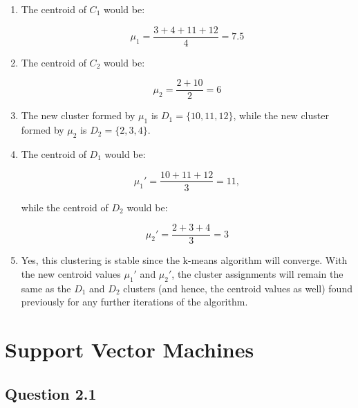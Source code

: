 \documentclass[11pt,fancychapters]{article}
\begin{document}
\begin{enumerate}[label=\textbf{\alph*)}]
	
\item The centroid of $C_1$ would be:

\begin{equation*}
	\mu_1 = \frac{3 + 4 + 11 + 12}{4} = 7.5
\end{equation*}

\item The centroid of $C_2$ would be:

\begin{equation*}
	\mu_2 = \frac{2 + 10}{2} = 6
\end{equation*}

\item The new cluster formed by $\mu_1$ is $D_1 = \{10, 11, 12\}$, while the new cluster formed by $\mu_2$ is $D_2 = \{2, 3, 4\}$.

\item The centroid of $D_1$ would be:

\begin{equation*}
	\mu_1' = \frac{10 + 11 + 12}{3} = 11,
\end{equation*}

while the centroid of $D_2$ would be:

\begin{equation*}
	\mu_2' = \frac{2 + 3 + 4}{3} = 3
\end{equation*}

\item Yes, this clustering is stable since the k-means algorithm will converge. With the new centroid values $\mu_1'$ and $\mu_2'$, the cluster assignments will remain the same as the $D_1$ and $D_2$ clusters (and hence, the centroid values as well) found previously for any further iterations of the algorithm.

\end{enumerate}

\section{Support Vector Machines}

\subsection*{Question 2.1}
\end{document}
